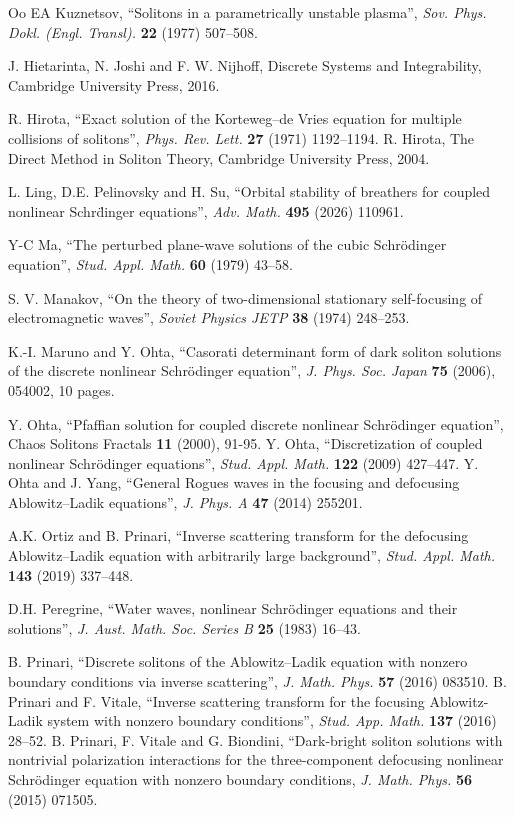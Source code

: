 \documentclass{article}
\begin{document}
\begin{thebibliography}{Oo}
 EA Kuznetsov, ``Solitons in a parametrically unstable plasma'', \textit{Sov. Phys. Dokl. (Engl. Transl).} \textbf{22} (1977) 507--508.

 J. Hietarinta, N. Joshi and F. W. Nijhoff, Discrete Systems and Integrability, Cambridge University Press, 2016.

 R. Hirota, ``Exact solution of the Korteweg–de Vries equation for multiple collisions of solitons'', \textit{Phys. Rev. Lett.} \textbf{27} (1971) 1192--1194.
 R. Hirota, The Direct Method in Soliton Theory, Cambridge University Press, 2004.

 L. Ling, D.E. Pelinovsky and H. Su, ``Orbital stability of breathers for coupled nonlinear Schr\"dinger equations'', \textit{Adv. Math.} \textbf{495} (2026) 110961.

 Y-C Ma, ``The perturbed plane-wave solutions of the cubic Schr\"odinger equation'', \textit{Stud. Appl. Math.} \textbf{60} (1979)  43--58.

 S. V. Manakov, ``On the theory of two-dimensional stationary self-focusing of electromagnetic waves'', \textit{Soviet Physics JETP} \textbf{38} (1974) 248--253.

 K.-I. Maruno and Y. Ohta, ``Casorati determinant form of dark soliton solutions of the discrete nonlinear Schr\"odinger equation'', \textit{J. Phys. Soc. Japan} \textbf{75} (2006), 054002, 10 pages.

 Y. Ohta, ``Pfaffian solution for coupled discrete nonlinear Schr\"odinger equation'', Chaos Solitons Fractals \textbf{11} (2000), 91-95.
 Y. Ohta, ``Discretization of coupled nonlinear Schr\"odinger equations'', \textit{Stud. Appl. Math.} \textbf{122} (2009) 427--447.
 Y. Ohta and J. Yang, ``General Rogues waves in the focusing and defocusing Ablowitz–Ladik equations'', \textit{J. Phys. A} \textbf{47} (2014) 255201.

 A.K. Ortiz and B. Prinari, ``Inverse scattering transform for the defocusing Ablowitz–Ladik equation with arbitrarily large background'', \textit{Stud. Appl. Math.} \textbf{143} (2019) 337–448.

 D.H. Peregrine, ``Water waves, nonlinear Schr\"odinger equations and their solutions'', \textit{J. Aust. Math. Soc. Series B} \textbf{25} (1983)  16--43.

 B. Prinari, ``Discrete solitons of the Ablowitz–Ladik equation with nonzero boundary conditions via inverse scattering'', \textit{J. Math. Phys.} \textbf{57} (2016) 083510.
 B. Prinari and F. Vitale, ``Inverse scattering transform for the focusing Ablowitz-Ladik system with nonzero boundary conditions'', \textit{Stud. App. Math.} \textbf{137} (2016) 28--52.
	B. Prinari, F. Vitale and G. Biondini, ``Dark-bright soliton solutions with nontrivial polarization interactions for the three-component defocusing nonlinear Schr\"odinger equation with nonzero boundary conditions, \textit{J. Math. Phys.} \textbf{56} (2015) 071505.


\end{thebibliography}
\end{document}
